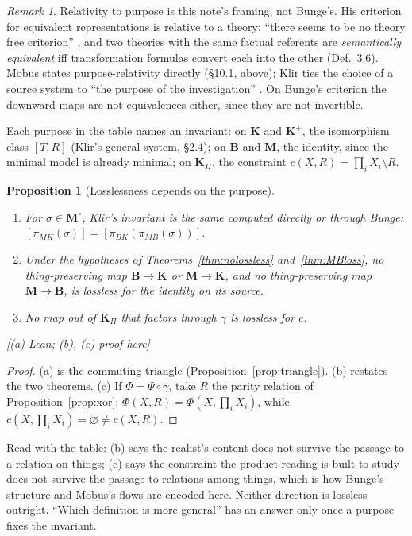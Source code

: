 \documentclass[11pt]{article}
\newtheorem{proposition}[theorem]{Proposition}
\theoremstyle{definition}
\theoremstyle{remark}
\newtheorem{remark}[theorem]{Remark}
\newcommand{\K}{\mathbf{K}}
\newcommand{\Kp}{\mathbf{K}^{+}}
\newcommand{\KP}{\mathbf{K}_{\Pi}}
\newcommand{\B}{\mathbf{B}}
\newcommand{\M}{\mathbf{M}}
\newcommand{\Mo}{\mathbf{M}^{\circ}}
\newcommand{\status}[1]{\hfill\textsf{\small[#1]}}
\newcommand{\pBK}{\pi_{BK}}
\newcommand{\pMB}{\pi_{MB}}
\newcommand{\pMK}{\pi_{MK}}
\begin{document}
\begin{remark}
Relativity to purpose is this note's framing, not Bunge's. His criterion for equivalent representations is relative to a theory: ``there seems to be no theory free criterion'' \cite[Ch.~3 \S2.3]{bunge1974a}, and two theories with the same factual referents are \emph{semantically equivalent} iff transformation formulas convert each into the other (Def.~3.6). Mobus states purpose-relativity directly (\S10.1, above); Klir ties the choice of a source system to ``the purpose of the investigation'' \cite[\S4.4]{klir2001}. On Bunge's criterion the downward maps are not equivalences either, since they are not invertible.
\end{remark}

Each purpose in the table names an invariant: on $\K$ and $\Kp$, the isomorphism class $[T,R]$ (Klir's general system, \S2.4); on $\B$ and $\M$, the identity, since the minimal model is already minimal; on $\KP$, the constraint $c(X,R)=\prod_iX_i\setminus R$.

\begin{proposition}[Losslessness depends on the purpose]\label{prop:purpose}
\begin{enumerate}[label=(\alph*),nosep]
\item For $\sigma\in\Mo$, Klir's invariant is the same computed directly or through Bunge: $[\pMK(\sigma)]=[\pBK(\pMB(\sigma))]$.
\item Under the hypotheses of Theorems~\ref{thm:nolossless} and~\ref{thm:MBloss}, no thing-preserving map $\B\to\K$ or $\M\to\K$, and no thing-preserving map $\M\to\B$, is lossless for the identity on its source.
\item No map out of $\KP$ that factors through $\gamma$ is lossless for $c$.
\end{enumerate}\status{(a) Lean; (b), (c) proof here}
\end{proposition}
\begin{proof}
(a) is the commuting triangle (Proposition~\ref{prop:triangle}). (b) restates the two theorems. (c) If $\Phi=\Psi\circ\gamma$, take $R$ the parity relation of Proposition~\ref{prop:xor}: $\Phi(X,R)=\Phi(X,\prod_iX_i)$, while $c(X,\prod_iX_i)=\varnothing\neq c(X,R)$.
\end{proof}

Read with the table: (b) says the realist's content does not survive the passage to a relation on things; (c) says the constraint the product reading is built to study does not survive the passage to relations among things, which is how Bunge's structure and Mobus's flows are encoded here. Neither direction is lossless outright. ``Which definition is more general'' has an answer only once a purpose fixes the invariant.
\end{document}
